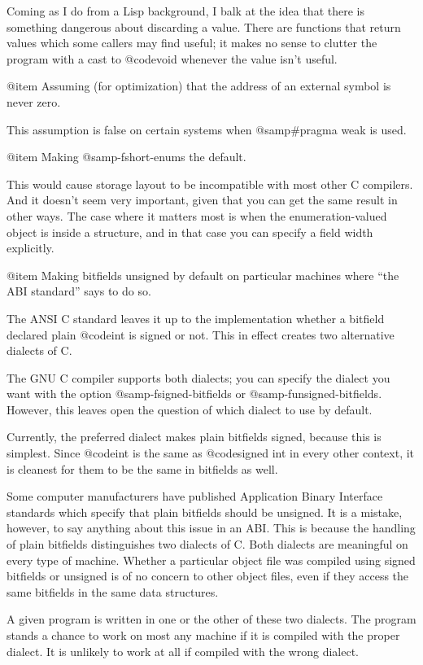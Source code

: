 Coming as I do from a Lisp background, I balk at the idea that there is
something dangerous about discarding a value.  There are functions that
return values which some callers may find useful; it makes no sense to
clutter the program with a cast to @code{void} whenever the value isn't
useful.

@item
Assuming (for optimization) that the address of an external symbol is
never zero.

This assumption is false on certain systems when @samp{#pragma weak} is
used.

@item
Making @samp{-fshort-enums} the default.

This would cause storage layout to be incompatible with most other C
compilers.  And it doesn't seem very important, given that you can get
the same result in other ways.  The case where it matters most is when
the enumeration-valued object is inside a structure, and in that case
you can specify a field width explicitly.

@item
Making bitfields unsigned by default on particular machines where ``the
ABI standard'' says to do so.

The ANSI C standard leaves it up to the implementation whether a bitfield
declared plain @code{int} is signed or not.  This in effect creates two
alternative dialects of C.

The GNU C compiler supports both dialects; you can specify the dialect
you want with the option @samp{-fsigned-bitfields} or
@samp{-funsigned-bitfields}.  However, this leaves open the question
of which dialect to use by default.

Currently, the preferred dialect makes plain bitfields signed, because
this is simplest.  Since @code{int} is the same as @code{signed int} in
every other context, it is cleanest for them to be the same in bitfields
as well.

Some computer manufacturers have published Application Binary Interface
standards which specify that plain bitfields should be unsigned.  It is
a mistake, however, to say anything about this issue in an ABI.  This is
because the handling of plain bitfields distinguishes two dialects of C.
Both dialects are meaningful on every type of machine.  Whether a
particular object file was compiled using signed bitfields or unsigned
is of no concern to other object files, even if they access the same
bitfields in the same data structures.

A given program is written in one or the other of these two dialects.
The program stands a chance to work on most any machine if it is
compiled with the proper dialect.  It is unlikely to work at all if
compiled with the wrong dialect.

